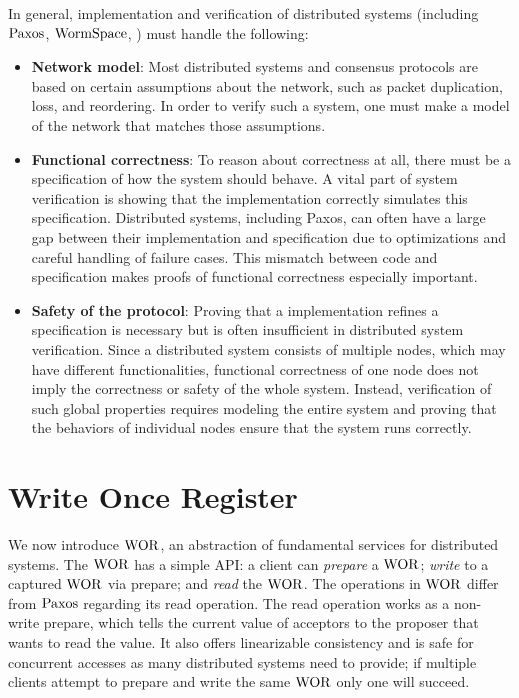 In general, implementation and verification of distributed systems
(including $\mathrm{Paxos}$, $\mathrm{WormSpace}$, \etc) must handle the following:
\begin{itemize}

\item \textbf{Network model}:
Most distributed systems and consensus protocols are based on certain assumptions about the network,
such as packet duplication, loss, and reordering. In order to verify such a system, one must make a model of the network that matches
those assumptions.

\item \textbf{Functional correctness}: 
To reason about correctness at all, there must be a specification of how the system should behave.
A vital part of  system verification is showing that the implementation correctly simulates this specification.
Distributed systems, including Paxos, can often have a large gap between their implementation and specification due to optimizations and careful handling of failure cases.
This mismatch between code and specification makes proofs of functional correctness especially important.

\item \textbf{Safety of the protocol}: 
Proving that a implementation refines a specification is necessary but is often insufficient in distributed system verification.
Since a distributed system consists of multiple nodes, which may have different functionalities,
functional correctness of one node does not imply the correctness or safety of the whole system.
Instead, verification of such global properties requires modeling the entire system and
proving that the behaviors of individual nodes ensure that the system runs correctly.
\end{itemize}

\section{Write Once Register}
\label{chapter:wormspace:sec:write-once-register}

We now introduce $\mathrm{WOR}$, an abstraction of fundamental services for distributed systems. 
The $\mathrm{WOR}$ has a simple API: a client can \textit{prepare} a $\mathrm{WOR}$; \textit{write} to a captured $\mathrm{WOR}$ via prepare; and \textit{read} the  $\mathrm{WOR}$. 
The operations in $\mathrm{WOR}$ differ from $\mathrm{Paxos}$ regarding its read operation. 
The read operation works as a non-write prepare, which tells the current value of acceptors to the proposer that wants to read the value.
It also offers linearizable consistency and is safe for concurrent accesses as many distributed systems need to provide; 
if multiple clients attempt to prepare and write the same $\mathrm{WOR}$ only one will succeed.

